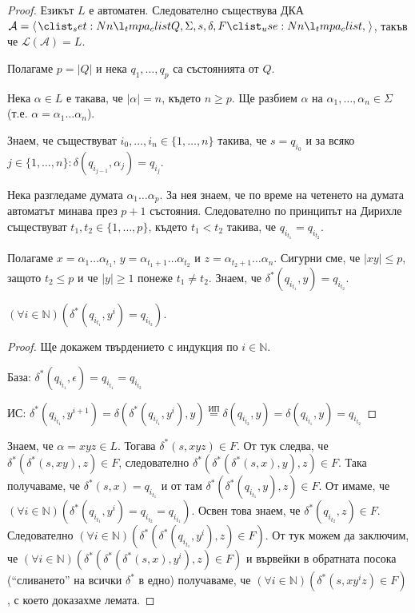 \begin{proof}
    Езикът $L$ е автоматен.
    Следователно съществува ДКА
    $\mathcal{A} = \opair{Q, \Sigma, s, \delta, F}$,
    такъв че $\mathcal{L}(\mathcal{A}) = L$.

    Полагаме $p = |Q|$ и нека $q_1, \dots, q_p$ са състоянията от $Q$.

    Нека $\alpha \in L$ е такава, че $|\alpha| = n$, където $n \geq p$.
    Ще разбием $\alpha$ на $\alpha_1, \dots, \alpha_n \in \Sigma$ (т.е. $\alpha = \alpha_1\dots\alpha_n$).

    Знаем, че съществуват $i_0, \dots, i_n \in \{1, \dots, n \}$ такива,
    че $s = q_{i_0}$ и за всяко $j \in \{1, \dots, n\} : \delta(q_{i_{j-1}}, \alpha_j) = q_{i_j}$.

    Нека разгледаме думата $\alpha_1 \dots \alpha_p$.
    За нея знаем, че по време на четенето на думата автоматът минава през $p + 1$ състояния.
    Следователно по принципът на Дирихле съществуват
    $t_1, t_2 \in \{1, \dots, p\}$, където $t_1 < t_2$ такива, че $q_{i_{t_1}} = q_{i_{t_2}}$.

    Полагаме $x = \alpha_1 \dots \alpha_{t_1}$, $y = \alpha_{t_1 + 1} \dots \alpha_{t_2}$ и $z = \alpha_{t_2 + 1} \dots \alpha_n$.
    Сигурни сме, че $|xy| \leq p$, защото $t_2 \leq p$ и че $|y| \geq 1$ понеже $t_1 \neq t_2$.
    Знаем, че $\delta^*(q_{i_{t_1}}, y) = q_{i_{t_2}}$.

    \begin{claim}
        $(\forall i \in \mathbb{N}) (\delta^*(q_{i_{t_1}}, y^i) = q_{i_{t_2}})$.
    \end{claim}

    \begin{proof}
        Ще докажем твърдението с индукция по $i \in \mathbb{N}$.

        База: $\delta^*(q_{i_{t_1}}, \epsilon) = q_{i_{t_1}} = q_{i_{t_2}}$ \checkmark

        ИС: $\delta^*(q_{i_{t_1}}, y^{i+1}) = \delta(\delta^*(q_{i_{t_1}}, y^i), y) \overset{\text{ИП}}{=} \delta(q_{i_{t_2}}, y) = \delta(q_{i_{t_1}}, y) = q_{i_{t_2}}$
    \end{proof}

    Знаем, че $\alpha = xyz \in L$.
    Тогава $\delta^*(s, xyz) \in F$.
    От тук следва, че $\delta^*(\delta^*(s, xy), z) \in F$, следователно $\delta^*(\delta^*(\delta^*(s, x), y), z) \in F$.
    Така получаваме, че $\delta^*(s, x) = q_{i_{t_1}}$ и от там $\delta^*(\delta^*(q_{i_{t_1}}, y), z) \in F$.
    От  имаме, че $(\forall i \in \mathbb{N}) (\delta^*(q_{i_{t_1}}, y^i) = q_{i_{t_2}} = q_{i_{t_1}})$.
    Освен това знаем, че $\delta^*(q_{i_{t_2}}, z) \in F$.
    Следователно
    $(\forall i \in \mathbb{N}) (\delta^*(\delta^*(q_{i_{t_1}}, y^i), z) \in F)$.
    От тук можем да заключим, че
    $(\forall i \in \mathbb{N}) (\delta^*(\delta^*(\delta^*(s, x), y^i), z) \in F)$
    и вървейки в обратната посока (``сливането'' на всички $\delta^*$ в едно) получаваме, че
    $(\forall i \in \mathbb{N}) (\delta^*(s, xy^iz) \in F)$,
    с което доказахме лемата.
\end{proof}

